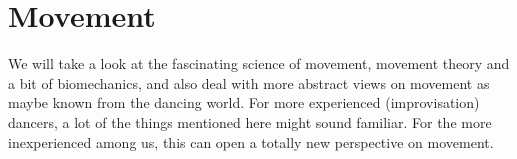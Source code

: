 \chapter{Movement}\label{ch:movement}


We will take a look at the fascinating science of movement, movement theory and a bit of biomechanics, and also deal with more abstract views on movement as maybe known from the dancing world.
For more experienced (improvisation) dancers, a lot of the things mentioned here might sound familiar.
For the more inexperienced among us, this can open a totally new perspective on movement.




